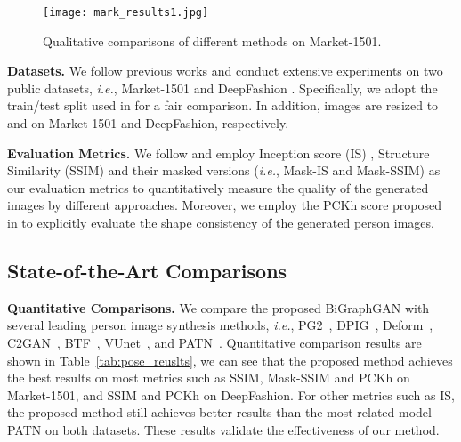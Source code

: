 \documentclass{bmvc2k}
\begin{document}
\begin{figure}[!t]
	\centering
	\texttt{[image: mark\_results1.jpg]}
	\caption{Qualitative comparisons of different methods on Market-1501.}
	\label{fig:mark_results}
\end{figure}

\noindent \textbf{Datasets.} 
We follow previous works \cite{ma2017pose,siarohin2018deformable,zhu2019progressive} and conduct extensive experiments on two public datasets, \emph{i.e.}, Market-1501 \cite{zheng2015scalable} and DeepFashion \cite{liu2016deepfashion}.
Specifically, we adopt the train/test split used in \cite{zhu2019progressive,tang2020xinggan} for a fair comparison.
In addition, images are resized to  and  on Market-1501 and DeepFashion, respectively.
 
\noindent \textbf{Evaluation Metrics.}
We follow \cite{ma2017pose,siarohin2018deformable,zhu2019progressive} and employ Inception score (IS) \cite{salimans2016improved}, Structure Similarity (SSIM) \cite{wang2004image} and their masked versions (\emph{i.e.}, Mask-IS and Mask-SSIM) as our evaluation metrics to quantitatively measure the quality of the generated images by different approaches.
Moreover, we employ the PCKh score proposed in \cite{zhu2019progressive} to explicitly evaluate the shape consistency of the generated person images.







\subsection{State-of-the-Art Comparisons}

\noindent \textbf{Quantitative Comparisons.}
We compare the proposed BiGraphGAN with several leading person image synthesis methods, \emph{i.e.}, PG2~\cite{ma2017pose}, DPIG~\cite{ma2018disentangled}, Deform~\cite{siarohin2018deformable,siarohin2019appearance}, C2GAN~\cite{tang2019cycle}, BTF~\cite{albahar2019guided}, VUnet~\cite{esser2018variational}, and PATN~\cite{zhu2019progressive}.
Quantitative comparison results are shown in Table~\ref{tab:pose_reuslts}, we can see that the proposed method achieves the best results on most metrics such as SSIM, Mask-SSIM and PCKh on Market-1501, and SSIM and PCKh on DeepFashion.
For other metrics such as IS, the proposed method still achieves better results than the most related model PATN on both datasets.
These results validate the effectiveness of our method.
\end{document}

